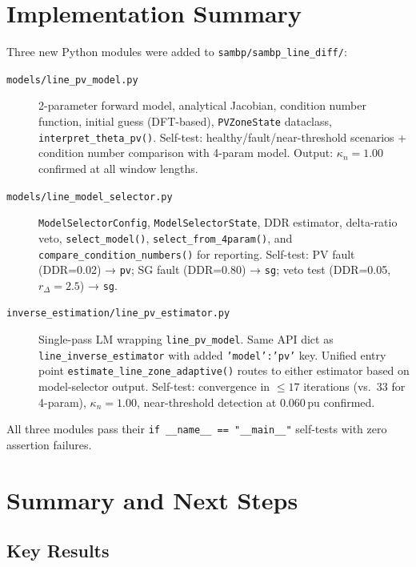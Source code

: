 \documentclass[11pt, a4paper]{article}
\newcommand{\kn}{\kappa_n}
\begin{document}
\section{Implementation Summary}
\label{sec:implementation}

Three new Python modules were added to
\texttt{sambp/sambp\_line\_diff/}:

\begin{description}
  \item[\texttt{models/line\_pv\_model.py}]
    2-parameter forward model, analytical Jacobian, condition number function,
    initial guess (DFT-based), \texttt{PVZoneState} dataclass,
    \texttt{interpret\_theta\_pv()}.
    Self-test: healthy/fault/near-threshold scenarios + condition number
    comparison with 4-param model.  Output: $\kn = 1.00$ confirmed at all
    window lengths.

  \item[\texttt{models/line\_model\_selector.py}]
    \texttt{ModelSelectorConfig}, \texttt{ModelSelectorState}, DDR estimator,
    delta-ratio veto, \texttt{select\_model()}, \texttt{select\_from\_4param()},
    and \texttt{compare\_condition\_numbers()} for reporting.
    Self-test: PV fault (DDR=0.02) → \texttt{pv}; SG fault (DDR=0.80) → \texttt{sg};
    veto test (DDR=0.05, $r_\Delta=2.5$) → \texttt{sg}.

  \item[\texttt{inverse\_estimation/line\_pv\_estimator.py}]
    Single-pass LM wrapping \texttt{line\_pv\_model}.  Same API dict as
    \texttt{line\_inverse\_estimator} with added \texttt{'model':'pv'} key.
    Unified entry point \texttt{estimate\_line\_zone\_adaptive()} routes
    to either estimator based on model-selector output.
    Self-test: convergence in $\leq 17$ iterations (vs.\ 33 for 4-param),
    $\kn = 1.00$, near-threshold detection at 0.060\,pu confirmed.
\end{description}

All three modules pass their \texttt{if \_\_name\_\_ == "\_\_main\_\_"} self-tests
with zero assertion failures.

\section{Summary and Next Steps}
\label{sec:summary}

\subsection{Key Results}
\end{document}
